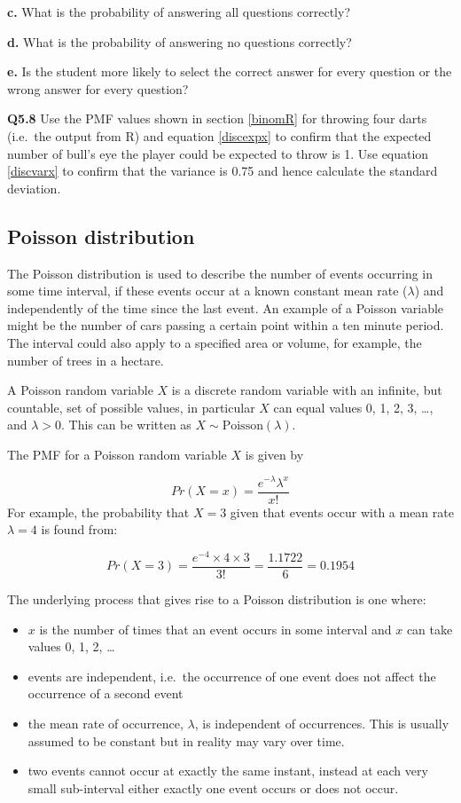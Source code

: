 \documentclass[
  oneside]{krantz}
\providecommand{\tightlist}{%
  \setlength{\itemsep}{0pt}\setlength{\parskip}{0pt}}
\begin{document}
\textbf{c.} What is the probability of answering all questions correctly?

\textbf{d.} What is the probability of answering no questions correctly?

\textbf{e.} Is the student more likely to select the correct answer for every question or the wrong answer for every question?

\textbf{Q5.8} Use the PMF values shown in section \ref{binomR} for throwing four darts (i.e.~the output from R) and equation \ref{discexpx} to confirm that the expected number of bull's eye the player could be expected to throw is 1. Use equation \ref{discvarx} to confirm that the variance is 0.75 and hence calculate the standard deviation.

\hypertarget{poisdist}{%
\subsection{Poisson distribution}\label{poisdist}}

The Poisson distribution is used to describe the number of events occurring in some time interval, if these events occur at a known constant mean rate (\(\lambda\)) and independently of the time since the last event. An example of a Poisson variable might be the number of cars passing a certain point within a ten minute period. The interval could also apply to a specified area or volume, for example, the number of trees in a hectare.

A Poisson random variable \(X\) is a discrete random variable with an infinite, but countable, set of possible values, in particular \(X\) can equal values 0, 1, 2, 3, \ldots, and \(\lambda > 0\). This can be written as \(X \sim \textrm{Poisson}(\lambda)\).

The PMF for a Poisson random variable \(X\) is given by

\[ Pr(X=x) = \frac{e^{-\lambda}\lambda^x}{x!}\]
For example, the probability that \(X=3\) given that events occur with a mean rate \(\lambda=4\) is found from:

\[ Pr(X=3) = \frac{e^{-4} \times 4 \times 3}{3!} = \frac{1.1722}{6} = 0.1954\]

The underlying process that gives rise to a Poisson distribution is one where:

\begin{itemize}
\tightlist
\item
  \(x\) is the number of times that an event occurs in some interval and \(x\) can take values 0, 1, 2, \ldots{}
\item
  events are independent, i.e.~the occurrence of one event does not affect the occurrence of a second event
\item
  the mean rate of occurrence, \(\lambda\), is independent of occurrences. This is usually assumed to be constant but in reality may vary over time.
\item
  two events cannot occur at exactly the same instant, instead at each very small sub-interval either exactly one event occurs or does not occur.
\end{itemize}
\end{document}
